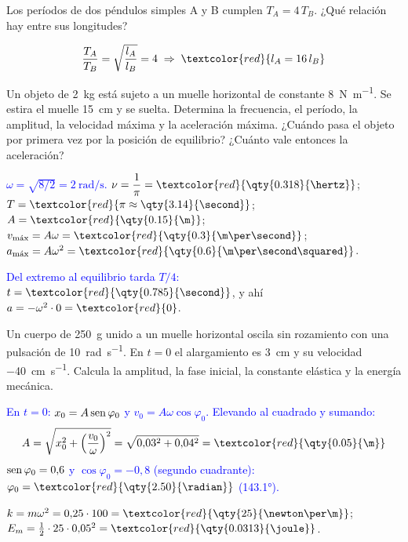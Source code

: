 \begin{exercise}
    Los períodos de dos péndulos simples A y B cumplen \(T_A = 4\,T_B\). ¿Qué relación hay entre sus longitudes?
    \begin{solu}
        \[ \dfrac{T_A}{T_B} = \sqrt{\dfrac{l_A}{l_B}} = 4 \;\Rightarrow\; \textcolor{red}{l_A = 16\,l_B} \]
    \end{solu}
\end{exercise}

\begin{exercise}
    Un objeto de \qty{2}{\kg} está sujeto a un muelle horizontal de constante \qty{8}{\newton\per\m}. Se estira el muelle
    \qty{15}{\cm} y se suelta. Determina la frecuencia, el período, la amplitud, la velocidad máxima y la aceleración máxima.
    ¿Cuándo pasa el objeto por primera vez por la posición de equilibrio? ¿Cuánto vale entonces la aceleración?
    \begin{solu}
        \textcolor{blue}{\(\omega = \sqrt{8/2} = \qty{2}{\radian\per\second}\).}
        \(\nu = \dfrac{1}{\pi} = \textcolor{red}{\qty{0.318}{\hertz}}\); \(T = \textcolor{red}{\pi \approx \qty{3.14}{\second}}\);
        \(A = \textcolor{red}{\qty{0.15}{\m}}\); \(v_{\text{máx}} = A\omega = \textcolor{red}{\qty{0.3}{\m\per\second}}\);
        \(a_{\text{máx}} = A\omega^2 = \textcolor{red}{\qty{0.6}{\m\per\second\squared}}\).

        \textcolor{blue}{Del extremo al equilibrio tarda \(T/4\):} \(t = \textcolor{red}{\qty{0.785}{\second}}\), y ahí \(a = -\omega^2\cdot 0 = \textcolor{red}{0}\).
    \end{solu}
\end{exercise}

\begin{exercise}
    Un cuerpo de \qty{250}{\g} unido a un muelle horizontal oscila sin rozamiento con una pulsación de
    \qty{10}{\radian\per\second}. En \(t = 0\) el alargamiento es \qty{3}{\cm} y su velocidad \qty{-40}{\cm\per\second}.
    Calcula la amplitud, la fase inicial, la constante elástica y la energía mecánica.
    \begin{solu}
        \textcolor{blue}{En \(t = 0\): \(x_0 = A\operatorname{sen}\varphi_0\) y \(v_0 = A\omega\cos\varphi_0\). Elevando al cuadrado y sumando:}
        \[ A = \sqrt{x_0^2 + \left(\dfrac{v_0}{\omega}\right)^2} = \sqrt{0{,}03^2 + 0{,}04^2} = \textcolor{red}{\qty{0.05}{\m}} \]
        \textcolor{blue}{\(\operatorname{sen}\varphi_0 = 0{,}6\) y \(\cos\varphi_0 = -0{,}8\) (segundo cuadrante):} \(\varphi_0 = \textcolor{red}{\qty{2.50}{\radian}}\) \textcolor{blue}{(\ang{143.1}).}

        \(k = m\omega^2 = 0{,}25\cdot 100 = \textcolor{red}{\qty{25}{\newton\per\m}}\); \(E_m = \frac{1}{2}\cdot 25\cdot 0{,}05^2 = \textcolor{red}{\qty{0.0313}{\joule}}\).
    \end{solu}
\end{exercise}

